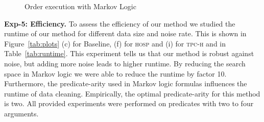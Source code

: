 
\begin{figure}
\centering
{}
\caption{Order execution with Markov Logic} \label{fig:orderexec}
\end{figure}



\textbf{Exp-5: Efficiency.} To assess the efficiency of our method we studied the runtime of our method for different data size and noise rate. This is shown in Figure~\ref{tab:plots} (c) for Baseline, (f) for \textsc{hosp} and (i) for \textsc{tpc-h} and in Table~\ref{tab:runtime}. This experiment tells us that our method is robust against noise, but adding more noise leads to higher runtime. By reducing the search space in Markov logic we were able to reduce the runtime by factor 10. Furthermore, the predicate-arity used in Markov logic formulas influences the runtime of data cleaning. Empirically, the optimal predicate-arity for this method is two. All provided experiments were performed on predicates with two to four arguments. 

